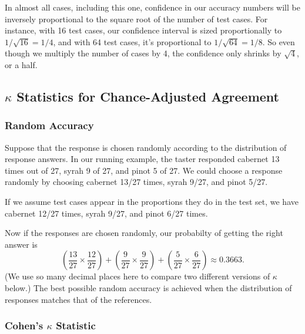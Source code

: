 In almost all cases, including this one, confidence in our accuracy
numbers will be inversely proportional to the square root of the
number of test cases.  For instance, with 16 test cases, our
confidence interval is sized proportionally to $1/\sqrt{16} = 1/4$,
and with 64 test cases, it's proportional to $1/\sqrt{64} = 1/8$.  So
even though we multiply the number of cases by 4, the confidence only
shrinks by $\sqrt{4}$, or a half.


\subsection{$\kappa$ Statistics for Chance-Adjusted Agreement}\label{section:classifier-eval-kappa}

\subsubsection{Random Accuracy}

Suppose that the response is chosen randomly according to the
distribution of response answers.  In our running example, the taster
responded cabernet 13 times out of 27, syrah 9 of 27, and pinot 5 of
27.  We could choose a response randomly by choosing cabernet 13/27
times, syrah 9/27, and pinot 5/27.  

If we assume test cases appear in the proportions they do in the test
set, we have cabernet 12/27 times, syrah 9/27, and pinot 6/27 times.

Now if the responses are chosen randomly, our probabilty of getting
the right answer is 
%
\begin{equation}
\left(\frac{13}{27} \times \frac{12}{27}\right)
+ \left(\frac{9}{27} \times \frac{9}{27}\right)
+ \left(\frac{5}{27} \times \frac{6}{27}\right)
\approx 0.3663.
\end{equation}
%
(We use so many decimal places here to compare two different versions
of $\kappa$ below.)  The best possible random accuracy is achieved
when the distribution of responses matches that of the references.

\subsubsection{Cohen's $\kappa$ Statistic}

